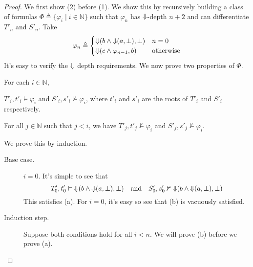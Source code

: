 \documentclass[a4paper,UKenglish,cleveref, autoref, thm-restate, numberwithinsect]{lipics-v2021}
\def\Darrow{\ensuremath\mathord{\Downarrow}}
\begin{document}
\begin{proof}
    We first show (2) before (1).
     We show this by recursively building a class of formulas $\Phi \triangleq \{ \varphi_i \mid i \in \mathbb{N}\}$ such that $\varphi_n$ has $\Darrow$-depth $n+2$ and can differentiate $T'_n$ and $S'_n$. Take
    \begin{equation*}
        \varphi_n \triangleq \begin{cases}
            \Darrow(b \land \Darrow(a, \bot), \bot) & n = 0\\
            \Darrow(c \land \varphi_{n - 1}, b) & \text{otherwise}
        \end{cases}
    \end{equation*}
    It's easy to verify the $\Darrow$ depth requirements. We now prove two properties of $\Phi$.
    \begin{claim*}
        For each $i \in \mathbb{N}$,
        \begin{alphaenumerate}
            \item $T'_i, t'_i \vDash \varphi_i$ and $S'_i, s'_i \nvDash \varphi_i$, where $t'_i$ and $s'_i$ are the roots of $T'_i$ and $S'_i$ respectively.
            \item For all $j \in \mathbb{N}$ such that $j < i$, we have $T'_j, t'_j \nvDash \varphi_i$ and $S'_j, s'_j \nvDash \varphi_i$.
        \end{alphaenumerate}
    \end{claim*}
    \begin{claimproof}
        We prove this by induction.
        \begin{description}
            \item[Base case.] $i = 0$. It's simple to see that
                \begin{equation*}
                    T'_0, t'_0 \vDash \Darrow(b \land \Darrow(a, \bot), \bot) \quad \text{and} \quad S'_0, s'_0 \nvDash \Darrow(b \land \Darrow(a, \bot), \bot)
                \end{equation*}
                This satisfies (a). For $i = 0$, it's easy so see that (b) is vacuously satisfied.
            \item[Induction step.] Suppose both conditions hold for all $i < n$. We will prove (b) before we prove (a).


\end{description}
\end{claimproof}
\end{proof}
\end{document}
